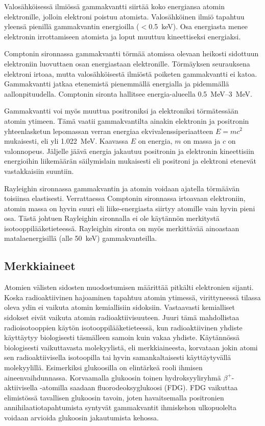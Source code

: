 Valosähköisessä ilmiössä gammakvantti siirtää koko energiansa atomin elektronille, jolloin elektroni poistuu atomista. Valosähköinen ilmiö tapahtuu yleensä pienillä gammakvantin energioilla ($<$\qty{0.5}{\kilo\electronvolt}). Osa energiasta menee elektronin irrottamiseen atomista ja loput muuttuu kineettiseksi energiaksi.\cite{cherry_interaction_2012}

Comptonin sironnassa gammakvantti törmää atomissa olevaan heikosti sidottuun elektroniin luovuttaen osan energiastaan elektronille. Törmäyksen seurauksena elektroni irtoaa, mutta valosähköisestä ilmiöstä poiketen gammakvantti ei katoa. Gammakvantti jatkaa etenemistä pienemmällä energialla ja pidemmällä aallonpituudella. Comptonin sironta hallitsee energia-alueella \qtyrange{0.5}{3}{\mega\electronvolt}.\cite{cherry_interaction_2012}

Gammakvantti voi myös muuttua positroniksi ja elektroniksi törmätessään atomin ytimeen. Tämä vaatii gammakvantilta ainakin elektronin ja positronin yhteenlasketun lepomassan verran energiaa ekvivalenssiperiaatteen $E=mc^2$ mukaisesti, eli yli \qty{1.022}{\mega\electronvolt}. Kaavassa $E$ on energia, $m$ on massa ja $c$ on valonnopeus. Jäljelle jäävä energia jakautuu positronin ja elektronin kineettisiin energioihin liikemäärän säilymislain mukaisesti eli positroni ja elektroni etenevät vastakkaisiin suuntiin.\cite{cherry_interaction_2012}

Rayleighin sironnassa gammakvantin ja atomin voidaan ajatella törmäävän toisiinsa elastisesti. Verrattaessa Comptonin sironnassa irtoavaan elektroniin, atomin massa on hyvin suuri eli liike-energiasta siirtyy atomille vain hyvin pieni osa. Tästä johtuen Rayleighin sironnalla ei ole käytännön merkitystä isotooppilääketieteessä. Rayleighin sironta on myös merkittävää ainoastaan matalaenergisillä (alle \qty{50}{\kilo\electronvolt}) gammakvanteilla.\cite{cherry_interaction_2012}

\subsection{Merkkiaineet}
Atomien välisten sidosten muodostumisen määrittää pitkälti elektronien sijanti. Koska radioaktiivinen hajoaminen tapahtuu atomin ytimessä, virittyneessä tilassa oleva ydin ei vaikuta atomin kemiallisiin sidoksiin. Vastaavasti kemialliset sidokset eivät vaikuta atomin radioaktiivisuuteen.\cite{cherry_modes_2012} Juuri tämä mahdollistaa radioisotooppien käytön isotooppilääketieteessä, kun radioaktiivinen yhdiste käyttäytyy biologisesti täsmälleen samoin kuin vakaa yhdiste. Käytännössä biologisesti vaikuttavasta molekyylistä, eli merkkiaineesta, korvataan jokin atomi sen radioaktiivisella isotoopilla tai hyvin samankaltaisesti käyttäytyvällä molekyylillä\cite{cherry_modes_2012, crisan_radiopharmaceuticals_2022}. Esimerkiksi glukoosilla on elintärkeä rooli ihmisen aineenvaihdunnassa. Korvaamalla glukoosin toinen hydroksyyliryhmä $\beta^{+}$-aktiivisella -atomilla saadaan fluorodeoksyglukoosi (FDG). FDG vaikuttaa elimistössä tavallisen glukoosin tavoin, joten havaitsemalla positronien annihilaatiotapahtumista syntyvät gammakvantit ihmiskehon ulkopuolelta voidaan arvioida glukoosin jakautumista kehossa.\cite{crisan_radiopharmaceuticals_2022}

